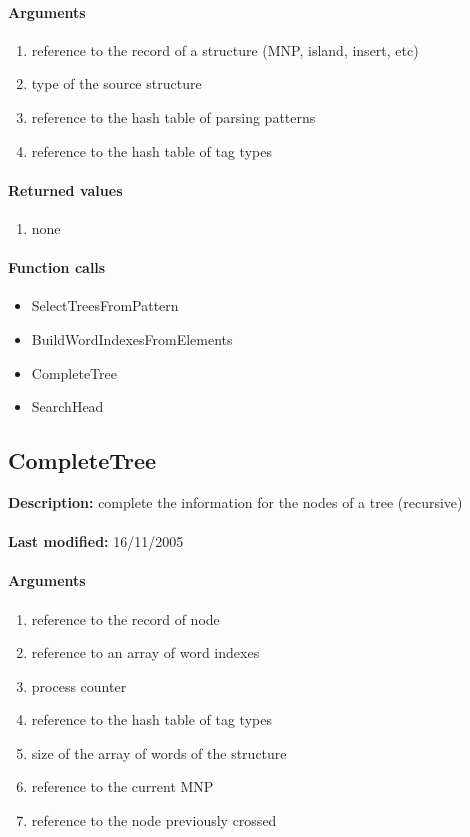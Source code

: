 \paragraph{Arguments}
\begin{enumerate}
\item reference to the record of a structure (MNP, island, insert, etc)
\item type of the source structure
\item reference to the hash table of parsing patterns
\item reference to the hash table of tag types
\end{enumerate}

\paragraph{Returned values}
\begin{enumerate}
\item none
\end{enumerate}

\paragraph{Function calls}
\begin{itemize}
\item SelectTreesFromPattern
\item BuildWordIndexesFromElements
\item CompleteTree
\item SearchHead
\end{itemize}

\subsection{CompleteTree}
\textbf{Description:} complete the information for the nodes of a tree (recursive)\\
\\\textbf{Last modified:} 16/11/2005

\paragraph{Arguments}
\begin{enumerate}
\item reference to the record of node
\item reference to an array of word indexes
\item process counter
\item reference to the hash table of tag types
\item size of the array of words of the structure
\item reference to the current MNP
\item reference to the node previously crossed
\end{enumerate}

